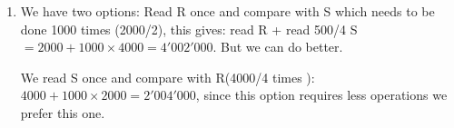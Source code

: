 \documentclass[12pt]{extarticle}
\begin{document}
\begin{flushleft}
\begin{enumerate}[label=\textbf{\Alph*.}]
\begin{enumerate}[label=\arabic*)]
\end{enumerate}

\item We have two options: Read R once and compare with S which needs to be done 1000 times (2000/2), this gives: read R + read 500/4 S$= 2000 + 1000\times4000=4'002'000$. But we can do better. 

We read S once and compare with R(4000/4 times ): $4000+ 1000 \times 2000=2'004'000$, since this option requires less operations we prefer this one. 
\end{enumerate}
\end{flushleft}
\end{document}

